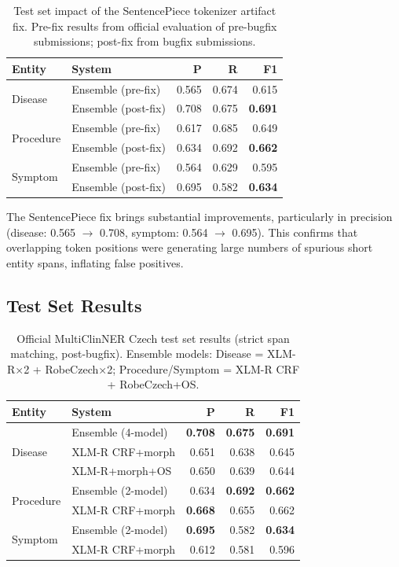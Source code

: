 \documentclass[11pt]{article}
\begin{document}
\begin{table}[h]
\centering
\small
\begin{tabular}{llrrr}
\toprule
\textbf{Entity} & \textbf{System} & \textbf{P} & \textbf{R} & \textbf{F1} \\
\midrule
\multirow{2}{*}{Disease}
  & Ensemble (pre-fix) & 0.565 & 0.674 & 0.615 \\
  & Ensemble (post-fix) & 0.708 & 0.675 & \textbf{0.691} \\
\midrule
\multirow{2}{*}{Procedure}
  & Ensemble (pre-fix) & 0.617 & 0.685 & 0.649 \\
  & Ensemble (post-fix) & 0.634 & 0.692 & \textbf{0.662} \\
\midrule
\multirow{2}{*}{Symptom}
  & Ensemble (pre-fix) & 0.564 & 0.629 & 0.595 \\
  & Ensemble (post-fix) & 0.695 & 0.582 & \textbf{0.634} \\
\bottomrule
\end{tabular}
\caption{Test set impact of the SentencePiece tokenizer artifact fix. Pre-fix results from
official evaluation of pre-bugfix submissions; post-fix from bugfix submissions.}
\label{tab:bugfix}
\end{table}

The SentencePiece fix brings substantial improvements, particularly in precision (disease:
0.565 $\to$ 0.708, symptom: 0.564 $\to$ 0.695). This confirms that overlapping token
positions were generating large numbers of spurious short entity spans, inflating false positives.

\subsection{Test Set Results}

\begin{table}[h]
\centering
\small
\begin{tabular}{llrrr}
\toprule
\textbf{Entity} & \textbf{System} & \textbf{P} & \textbf{R} & \textbf{F1} \\
\midrule
\multirow{3}{*}{Disease}
  & Ensemble (4-model) & \textbf{0.708} & \textbf{0.675} & \textbf{0.691} \\
  & XLM-R CRF+morph    & 0.651          & 0.638          & 0.645 \\
  & XLM-R+morph+OS     & 0.650          & 0.639          & 0.644 \\
\midrule
\multirow{2}{*}{Procedure}
  & Ensemble (2-model) & 0.634 & \textbf{0.692} & \textbf{0.662} \\
  & XLM-R CRF+morph    & \textbf{0.668} & 0.655          & 0.662 \\
\midrule
\multirow{2}{*}{Symptom}
  & Ensemble (2-model) & \textbf{0.695} & 0.582 & \textbf{0.634} \\
  & XLM-R CRF+morph    & 0.612          & 0.581 & 0.596 \\
\bottomrule
\end{tabular}
\caption{Official MultiClinNER Czech test set results (strict span matching, post-bugfix).
Ensemble models: Disease = XLM-R×2 + RobeCzech×2; Procedure/Symptom = XLM-R CRF + RobeCzech+OS.}
\label{tab:test}
\end{table}
\end{document}
